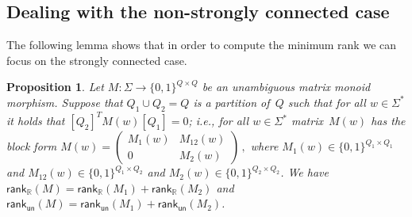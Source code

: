 \documentclass[11pt,a4paper]{amsart}
\newcommand{\rk}{\mathsf{rank}_{\mathbb{B}}}
\newcommand{\rkr}{\mathsf{rank}_{\mathbb{R}}}
\newcommand{\rku}{\mathsf{rank}_{\mathsf{un}}}
\newcommand{\rkg}{\mathsf{rank}}
\theoremstyle{plain}
\newtheorem{prop}[thm]{Proposition}
\theoremstyle{definition}
\theoremstyle{defC}
\theoremstyle{thmC}
\theoremstyle{plain}
\numberwithin{equation}{section}
\begin{document}
\subsection{Dealing with the non-strongly connected case}\label{subsec:non-sc}

The following lemma shows that in order to compute the minimum rank we can focus on the strongly connected case.

\begin{prop} \label{prop:unamb-sc}
Let $M : \Sigma \to \{0,1\}^{Q \times Q}$ be an unambiguous matrix monoid morphism.
Suppose that $Q_1 \cup Q_2 = Q$ is a partition of~$Q$ such that for all $w \in \Sigma^*$ it holds that $[Q_2]^T M(w) [Q_1] = 0$; i.e., for all $w \in \Sigma^*$ matrix~$M(w)$ has the block form
$
M(w) = \begin{pmatrix}
    M_1(w) & M_{12}(w) \\ 0 & M_2(w)
\end{pmatrix}\,,
$
where $M_1(w) \in \{0,1\}^{Q_1 \times Q_1}$ and $M_{12}(w) \in \{0,1\}^{Q_1 \times Q_2}$ and $M_2(w) \in \{0,1\}^{Q_2 \times Q_2}$.
We have $\rkr(M) = \rkr(M_1) + \rkr(M_2)$ and $\rku(M) = \rku(M_1) + \rku(M_2)$. %
\end{prop}
\end{document}
